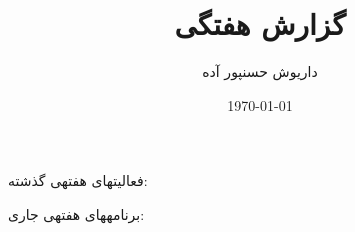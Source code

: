 \documentclass[12pt,a4paper]{article}
\renewcommand{\ }{\hspace{0pt}}
\newcommand{\فوتنت}[1]{\footnote{\lr{#1}}}
\begin{document}
\title{گزارش هفتگی}
\author{داریوش حسن\ پور آده}
\date{\today}
\maketitle
\thispagestyle{empty}
\noindent فعالیت\ های هفته\ ی گذشته:
\begin{enumerate}
\end{enumerate}
\noindent برنامه\ های هفته\ ی جاری:
\begin{enumerate}
\end{enumerate}
\end{document}
